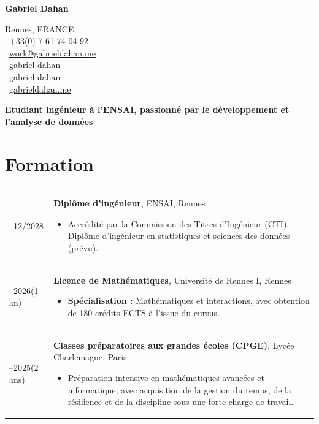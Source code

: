 \documentclass[11pt,a4paper]{article}
\begin{document}
\begin{minipage}[b]{0.6\textwidth}
    {\Huge \textbf{Gabriel Dahan}}
\end{minipage}
\hfill
\begin{minipage}[b]{0.35\textwidth}
    \raggedleft \small
    Rennes, FRANCE \\
    \faPhone \ +33(0) 7 61 74 04 92 \\
    \faEnvelope \ \href{mailto:work@gabrieldahan.me}{work@gabrieldahan.me} \\
    \faLinkedin \ \href{https://www.linkedin.com/in/gabriel-dahan/}{gabriel-dahan} \\
    \faGithub \ \href{https://github.com/gabriel-dahan}{gabriel-dahan} \\
    \faGlobe \ \href{https://gabrieldahan.me/}{gabrieldahan.me}
\end{minipage}

\vspace{0.4cm}

\textbf{Etudiant ingénieur à l'ENSAI, passionné par le développement et l'analyse de données}

\vspace{0.25cm}

\section*{Formation}

\begin{tabularx}{\textwidth}{@{}>{\raggedright\arraybackslash}p{3.15cm} X@{}}
2025--12/2028 & \textbf{Diplôme d'ingénieur}, ENSAI, Rennes
  \begin{itemize}[leftmargin=0.4cm, nosep, topsep=1pt]
    \item Accrédité par la Commission des Titres d'Ingénieur (CTI). Diplôme d'ingénieur en statistiques et sciences des données (prévu).
  \end{itemize} \\[0.45em]

2025--2026\newline (1 an) & \textbf{Licence de Mathématiques}, Université de Rennes I, Rennes
  \begin{itemize}[leftmargin=0.4cm, nosep, topsep=1pt]
    \item \textbf{Spécialisation :} Mathématiques et interactions, avec obtention de 180 crédits ECTS à l'issue du cursus.
  \end{itemize} \\[0.45em]

2023--2025\newline (2 ans) & \textbf{Classes préparatoires aux grandes écoles (CPGE)}, Lycée Charlemagne, Paris
  \begin{itemize}[leftmargin=0.4cm, nosep, topsep=1pt]
    \item Préparation intensive en mathématiques avancées et informatique, avec acquisition de la gestion du temps, de la résilience et de la discipline sous une forte charge de travail.
  \end{itemize}
\end{tabularx}
\end{document}
